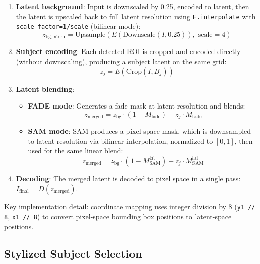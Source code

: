 \documentclass[11pt,a4paper]{article}
\begin{document}
\begin{enumerate}
  \item \textbf{Latent background}: Input is downscaled by 0.25, encoded to latent, then the latent is upscaled back to full latent resolution using \texttt{F.interpolate} with \texttt{scale\_factor=1/scale} (bilinear mode):
  \begin{equation}
    z_{\text{bg,interp}} = \text{Upsample}(E(\text{Downscale}(I, 0.25)),\; \text{scale}=4)
  \end{equation}

  \item \textbf{Subject encoding}: Each detected ROI is cropped and encoded directly (without downscaling), producing a subject latent on the same grid:
  \begin{equation}
    z_j = E(\text{Crop}(I, B_j))
  \end{equation}

  \item \textbf{Latent blending}:
  \begin{itemize}
    \item \textbf{FADE mode}: Generates a fade mask at latent resolution and blends:
    \begin{equation}
      z_{\text{merged}} = z_{\text{bg}} \cdot (1 - M_{\text{fade}}) + z_j \cdot M_{\text{fade}}
    \end{equation}

    \item \textbf{SAM mode}: SAM produces a pixel-space mask, which is downsampled to latent resolution via bilinear interpolation, normalized to $[0, 1]$, then used for the same linear blend:
    \begin{equation}
      z_{\text{merged}} = z_{\text{bg}} \cdot (1 - M_{\text{SAM}}^{\text{lat}}) + z_j \cdot M_{\text{SAM}}^{\text{lat}}
    \end{equation}
  \end{itemize}

  \item \textbf{Decoding}: The merged latent is decoded to pixel space in a single pass: $I_{\text{final}} = D(z_{\text{merged}})$.
\end{enumerate}

Key implementation detail: coordinate mapping uses integer division by 8 (\texttt{y1 // 8}, \texttt{x1 // 8}) to convert pixel-space bounding box positions to latent-space positions.

\subsection{Stylized Subject Selection}
\end{document}
